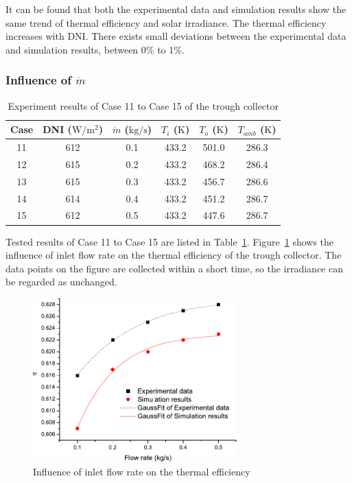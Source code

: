 It can be found that both the experimental data and simulation results show the same trend of thermal efficiency and solar irradiance.
The thermal efficiency increases with DNI.
There exists small deviations between the experimental data and simulation results, between 0\% to 1\%.

\subsubsection{Influence of $\dot{m}$}

\begin{table}[htbp]\footnotesize
	\caption{Experiment results of Case 11 to Case 15 of the trough collector}
	\begin{center}
	\begin{tabular}{cccccc}
		\toprule
		Case	& DNI ($\mathrm{W/m^2}$)	&	$\dot{m}$ ($\mathrm{kg/s}$)			&	$T_i$ ($\mathrm{K}$)	&	$T_o$ ($\mathrm{K}$)		&	$T_{amb}$ ($\mathrm{K}$)\\
		\midrule
		11	&	612	&	0.1	&	433.2	&	501.0	&	286.3\\
		12	&	615	&	0.2	&	433.2	&	468.2	&	286.4\\
		13	&	615	&	0.3	&	433.2	&	456.7	&	286.6	\\
		14	&	614	&	0.4	&	433.2	&	451.2	&	286.7\\
		15	&	612	&	0.5	&	433.2	&	447.6	&	286.7\\
		\bottomrule
	\end{tabular}
	\end{center}
	\label{tab:ResultOfTrough2}
\end{table}
Tested results of Case 11 to Case 15 are listed in Table~\ref{tab:ResultOfTrough2}.
Figure~\ref{fig:q_m-eta-trough} shows the influence of inlet flow rate on the thermal efficiency of the trough collector. The data points on the figure are collected within a short time, so the irradiance can be regarded as unchanged.
\begin{figure}[!ht]
\centering
\includegraphics[width=0.7\textwidth]{fig/q_m-eta-trough}
\caption{Influence of inlet flow rate on the thermal efficiency}
\label{fig:q_m-eta-trough}
\end{figure}

